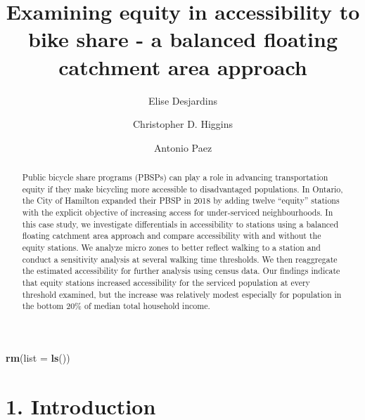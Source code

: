 \documentclass[]{elsarticle} %
\newenvironment{Shaded}{\begin{snugshade}}{\end{snugshade}}
\newcommand{\DataTypeTok}[1]{\textcolor[rgb]{0.13,0.29,0.53}{#1}}
\newcommand{\KeywordTok}[1]{\textcolor[rgb]{0.13,0.29,0.53}{\textbf{#1}}}
\newcommand{\NormalTok}[1]{#1}
\begin{document}
\begin{frontmatter}

  \title{Examining equity in accessibility to bike share - a balanced floating
catchment area approach}
    \author[McMaster University]{Elise Desjardins}
    \author[University of Toronto Scarborough]{Christopher D. Higgins}
    \author[McMaster University]{Antonio Paez}
      \address[McMaster University]{School of Earth, Environment \& Society, McMaster University, 1280 Main
Street West, Hamilton, ON L8S4L8}
    \address[University of Toronto Scarborough]{Department of Geography \& Planning, University of Toronto Scarborough,
1265 Military Trail, Toronto, ON M1C1A4}
  
  \begin{abstract}
  Public bicycle share programs (PBSPs) can play a role in advancing
  transportation equity if they make bicycling more accessible to
  disadvantaged populations. In Ontario, the City of Hamilton expanded
  their PBSP in 2018 by adding twelve ``equity'' stations with the
  explicit objective of increasing access for under-serviced
  neighbourhoods. In this case study, we investigate differentials in
  accessibility to stations using a balanced floating catchment area
  approach and compare accessibility with and without the equity stations.
  We analyze micro zones to better reflect walking to a station and
  conduct a sensitivity analysis at several walking time thresholds. We
  then reaggregate the estimated accessibility for further analysis using
  census data. Our findings indicate that equity stations increased
  accessibility for the serviced population at every threshold examined,
  but the increase was relatively modest especially for population in the
  bottom 20\% of median total household income.
  \end{abstract}
  
 \end{frontmatter}

\begin{Shaded}
\begin{Highlighting}[]
\KeywordTok{rm}\NormalTok{(}\DataTypeTok{list =} \KeywordTok{ls}\NormalTok{())}
\end{Highlighting}
\end{Shaded}

\newpage

\hypertarget{introduction}{%
\section{1. Introduction}\label{introduction}}
\end{document}
